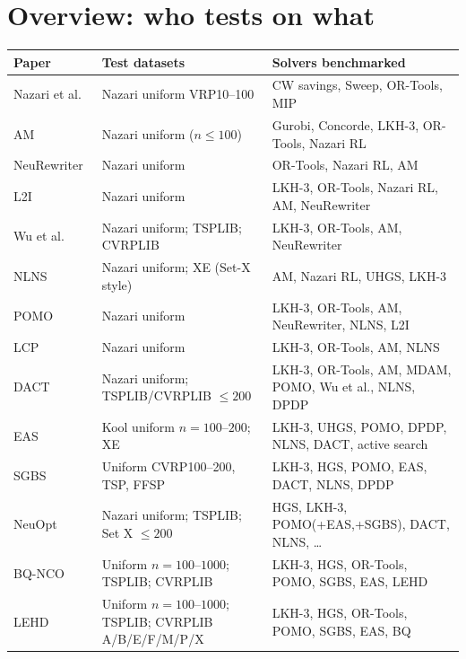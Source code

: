 \documentclass[11pt]{article}
\begin{document}
\section{Overview: who tests on what}
\label{sec:overview}

{\small
\begin{longtable}{@{}p{3.6cm}p{5.2cm}p{6.2cm}@{}}
\toprule
Paper & Test datasets & Solvers benchmarked \\
\midrule
\endhead
Nazari et al.~\citeyearpar{nazari_reinforcement_2018} & Nazari uniform VRP10--100 & CW savings, Sweep, OR-Tools, MIP \\
AM~\citeyearpar{kool_attention_2018} & Nazari uniform ($n\le100$) & Gurobi, Concorde, LKH-3, OR-Tools, Nazari RL \\
NeuRewriter~\citeyearpar{chen_learning_2019} & Nazari uniform & OR-Tools, Nazari RL, AM \\
L2I~\citeyearpar{Lu2020A} & Nazari uniform & LKH-3, OR-Tools, Nazari RL, AM, NeuRewriter \\
Wu et al.~\citeyearpar{wu_learning_2022} & Nazari uniform; TSPLIB; CVRPLIB & LKH-3, OR-Tools, AM, NeuRewriter \\
NLNS~\citeyearpar{hottung_andre_neural_2020} & Nazari uniform; XE (Set-X style) & AM, Nazari RL, UHGS, LKH-3 \\
POMO~\citeyearpar{kwon_pomo_2020} & Nazari uniform & LKH-3, OR-Tools, AM, NeuRewriter, NLNS, L2I \\
LCP~\citeyearpar{kim_learning_2021} & Nazari uniform & LKH-3, OR-Tools, AM, NLNS \\
DACT~\citeyearpar{ma_learning_2022} & Nazari uniform; TSPLIB/CVRPLIB $\le200$ & LKH-3, OR-Tools, AM, MDAM, POMO, Wu et al., NLNS, DPDP \\
EAS~\citeyearpar{hottung_efficient_2021} & Kool uniform $n{=}100$--$200$; XE & LKH-3, UHGS, POMO, DPDP, NLNS, DACT, active search \\
SGBS~\citeyearpar{choo_simulation-guided_2022} & Uniform CVRP100--200, TSP, FFSP & LKH-3, HGS, POMO, EAS, DACT, NLNS, DPDP \\
NeuOpt~\citeyearpar{ma_learning_2023} & Nazari uniform; TSPLIB; Set X $\le200$ & HGS, LKH-3, POMO(+EAS,+SGBS), DACT, NLNS, \dots \\
BQ-NCO~\citeyearpar{drakulic_bq-nco_2023} & Uniform $n{=}100$--$1000$; TSPLIB; CVRPLIB & LKH-3, HGS, OR-Tools, POMO, SGBS, EAS, LEHD \\
LEHD~\citeyearpar{luo_neural_2023} & Uniform $n{=}100$--$1000$; TSPLIB; CVRPLIB A/B/E/F/M/P/X & LKH-3, HGS, OR-Tools, POMO, SGBS, EAS, BQ \\

\end{longtable}}
\end{document}
